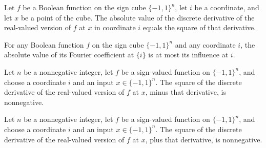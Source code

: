 \begin{theorem}
\label{FABL.abs_discreteDerivative_toReal_eq_sq}
\leanok
{}
Let $f$ be a Boolean function on the sign cube $\{−1,1\}^n$, let $i$ be a coordinate,
and let $x$ be a point of the cube. The absolute value of the discrete derivative of the
real-valued version of $f$ at $x$ in coordinate $i$ equals the square of that
derivative.
\end{theorem}

\begin{theorem}
\label{FABL.abs_fourierCoeff_singleton_le_influence}
\leanok
{}
For any Boolean function $f$ on the sign cube $\{-1,1\}^n$ and any coordinate $i$, the
absolute value of its Fourier coefficient at $\{i\}$ is at most its influence at $i$.
\end{theorem}

\begin{theorem}
\label{FABL.derivative_sq_sub_self_nonneg}
\leanok
{}
Let $n$ be a nonnegative integer, let $f$ be a sign-valued function on $\{-1,1\}^n$, and
choose a coordinate $i$ and an input $x\in\{-1,1\}^n$. The square of the discrete
derivative of the real-valued version of $f$ at $x$, minus that derivative, is
nonnegative.
\end{theorem}

\begin{theorem}
\label{FABL.derivative_sq_add_self_nonneg}
\leanok
{}
Let $n$ be a nonnegative integer, let $f$ be a sign-valued function on $\{-1,1\}^n$, and
choose a coordinate $i$ and an input $x\in\{-1,1\}^n$. The square of the discrete
derivative of the real-valued version of $f$ at $x$, plus that derivative, is
nonnegative.
\end{theorem}

